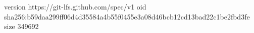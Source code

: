 version https://git-lfs.github.com/spec/v1
oid sha256:b59daa299ff06d4d35584a4b55f0455e3a08d46bcb12cd13bad22c1be2fbd3fe
size 349692
